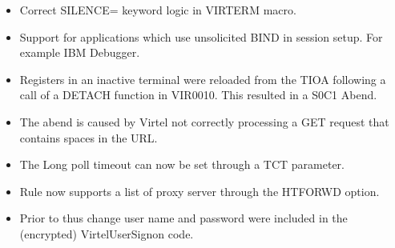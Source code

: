 \documentclass[letterpaper,10pt,english]{sphinxmanual}
\begin{document}
\begin{itemize}
\item {} 
Correct SILENCE= keyword logic in VIRTERM macro.

\end{itemize}

\begin{itemize}
\item {} 
Support for applications which use unsolicited BIND in session setup. For example IBM Debugger.

\end{itemize}

\begin{itemize}
\item {} 
Registers in an inactive terminal were reloaded from the TIOA following a call of a DETACH function in VIR0010. This resulted in a S0C1 Abend.

\end{itemize}

\begin{itemize}
\item {} 
The abend is caused by Virtel not correctly processing a GET request that contains spaces in the URL.

\end{itemize}

\begin{itemize}
\item {} 
The Long poll timeout can now be set through a TCT parameter.

\end{itemize}

\begin{itemize}
\item {} 
Rule now supports a list of proxy server through the HTFORWD option.

\end{itemize}

\begin{itemize}
\item {} 
Prior to thus change user name and password were included in the (encrypted) VirtelUserSignon code.

\end{itemize}
\end{document}
